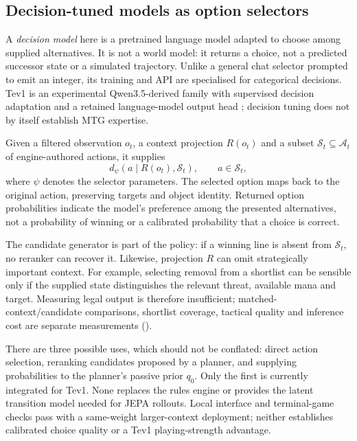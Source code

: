 \documentclass[11pt,a4paper]{article}
\theoremstyle{definition}
\theoremstyle{plain}
\begin{document}
\subsection{Decision-tuned models as option selectors}
\label{sec:decision-model-foundation}

A \emph{decision model} here is a pretrained language model adapted to choose among supplied alternatives. It is not a world model: it returns a choice, not a predicted successor state or a simulated trajectory. Unlike a general chat selector prompted to emit an integer, its training and API are specialised for categorical decisions. Tev1 is an experimental Qwen3.5-derived family with supervised decision adaptation and a retained language-model output head \citep{together2026tev1, ollama2026tev1}; decision tuning does not by itself establish MTG expertise.

Given a filtered observation $o_t$, a context projection $R(o_t)$ and a subset $\mathcal S_t\subseteq\mathcal A_t$ of engine-authored actions, it supplies
\begin{equation}
d_\psi(a\mid R(o_t),\mathcal S_t),\qquad a\in\mathcal S_t,
\end{equation}
where $\psi$ denotes the selector parameters. The selected option maps back to the original action, preserving targets and object identity. Returned option probabilities indicate the model's preference among the presented alternatives, not a probability of winning or a calibrated probability that a choice is correct.

The candidate generator is part of the policy: if a winning line is absent from $\mathcal S_t$, no reranker can recover it. Likewise, projection $R$ can omit strategically important context. For example, selecting removal from a shortlist can be sensible only if the supplied state distinguishes the relevant threat, available mana and target. Measuring legal output is therefore insufficient; matched-context/candidate comparisons, shortlist coverage, tactical quality and inference cost are separate measurements ().

There are three possible uses, which should not be conflated: direct action selection, reranking candidates proposed by a planner, and supplying probabilities to the planner's passive prior $q_0$. Only the first is currently integrated for Tev1. None replaces the rules engine or provides the latent transition model needed for JEPA rollouts. Local interface and terminal-game checks pass with a same-weight larger-context deployment; neither establishes calibrated choice quality or a Tev1 playing-strength advantage.
\end{document}
